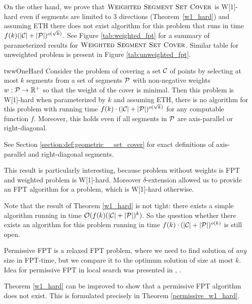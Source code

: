 On the other hand, we prove that $\textsc{Weighted Segment Set Cover}$ 
is W[1]-hard even if segments are limited to 3 directions (Theorem~\ref{w1_hard})
and assuming ETH there does not exist algorithm for this problem
that runs in time ${f(k)(|\mathcal{C}| + |\mathcal{P}|)^{o(\sqrt{k})}}$.
See Figure \ref{tab:weighted_fpt} for a summary of parameterized
results for $\textsc{Weighted Segment Set Cover}$.
Similar table for unweighted problem is present in Figure \ref{tab:unweighted_fpt}.

\begin{restatable}{tw}{wOneHard}
\label{w1_hard}
	Consider the problem of covering a set $\mathcal{C}$ of points
	by selecting at most $k$ segments
	from a set of segments $\mathcal{P}$ 
	with non-negative weights $w : \mathcal{P} \rightarrow \mathbb{R^+}$
	so that the weight of the cover is minimal.
	Then this problem is W[1]-hard when parameterized by $k$ and
	assuming ETH, there is no algorithm for this
	problem with running time
	$f(k)\cdot(|\mathcal{C}| + |\mathcal{P}|)^{o(\sqrt{k})}$
	for any computable function $f$.
	Moreover, this holds even if all segments in $\mathcal{P}$
	are axis-parallel or right-diagonal.
\end{restatable}

See Section \ref{section:def:geometric__set_cover}
for exact definitions of axis-parallel and right-diagonal segments.

This result is particularly interesting,
because problem without weights is FPT and weighted problem is W[1]-hard.
Moreover $\delta$-extension allowed us to provide an FPT algorithm
for a problem, which is W[1]-hard otherwise.

Note that the result of Theorem \ref{w1_hard} is not tight:
there exists a simple algorithm 
running in time ${\mathcal{O}(f(k)(|\mathcal{C}| + |\mathcal{P}|)^k)}$.
So the question whether there exists an algorithm
for this problem running in time ${f(k)\cdot(|\mathcal{C}| + |\mathcal{P}|)^{o(k)}}$
is still open.

Permissive FPT is a relaxed FPT problem, where 
we need to find solution of \textit{any} size in FPT-time,
but we compare it to the optimum solution of size at most $k$.
Idea for permissive FPT in local search was presented
in \cite{permissive_problem1}, \cite{permissive_problem2}.

Theorem \ref{w1_hard} can be improved to show that a permissive FPT
algorithm does not exist.
This is formulated precisely in Theorem \ref{permissive_w1_hard}.

